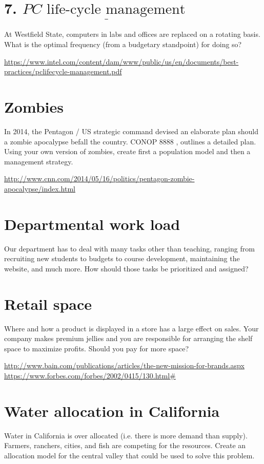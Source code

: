 \documentclass[10pt]{article}
\begin{document}
\section{7. $\underline{P C \text { life-cycle management }}$}
At Westfield State, computers in labs and offices are replaced on a rotating basis. What is the optimal frequency (from a budgetary standpoint) for doing so?

\href{https://www.intel.com/content/dam/www/public/us/en/documents/best-practices/pclifecycle-management.pdf}{https://www.intel.com/content/dam/www/public/us/en/documents/best-practices/pclifecycle-management.pdf}

\section{Zombies}
In 2014, the Pentagon / US strategic command devised an elaborate plan should a zombie apocalypse befall the country. CONOP 8888 , outlines a detailed plan. Using your own version of zombies, create first a population model and then a management strategy.

\href{http://www.cnn.com/2014/05/16/politics/pentagon-zombie-apocalypse/index.html}{http://www.cnn.com/2014/05/16/politics/pentagon-zombie-apocalypse/index.html}

\section{Departmental work load}
Our department has to deal with many tasks other than teaching, ranging from recruiting new students to budgets to course development, maintaining the website, and much more. How should those tasks be prioritized and assigned?

\section{Retail space}
Where and how a product is displayed in a store has a large effect on sales. Your company makes premium jellies and you are responsible for arranging the shelf space to maximize profits. Should you pay for more space?

\href{http://www.bain.com/publications/articles/the-new-mission-for-brands.aspx}{http://www.bain.com/publications/articles/the-new-mission-for-brands.aspx} \href{https://www.forbes.com/forbes/2002/0415/130.html#}{https://www.forbes.com/forbes/2002/0415/130.html\#}

\section{Water allocation in California}
Water in California is over allocated (i.e. there is more demand than supply). Farmers, ranchers, cities, and fish are competing for the resources. Create an allocation model for the central valley that could be used to solve this problem.
\end{document}
